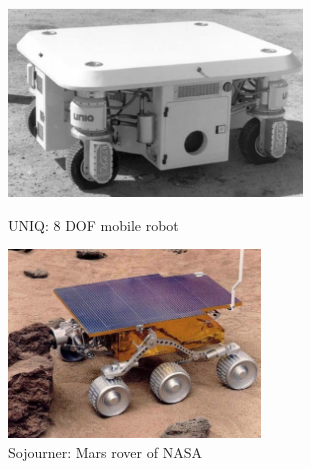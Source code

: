 \documentclass[12pt,english]{article}
\begin{document}
\begin{figure}[htb!]
	\centering
	\centering
	\includegraphics[height=5cm]{figures/uniq.png}
	\caption{UNIQ: 8 DOF mobile robot}
	\endminipage\hfill
	\centering
	\includegraphics[height=5cm]{figures/rover.png}
	\caption{Sojourner: Mars rover of NASA}
	\label{mecanum}
	\endminipage\hfill
\end{figure}








\end{document}
